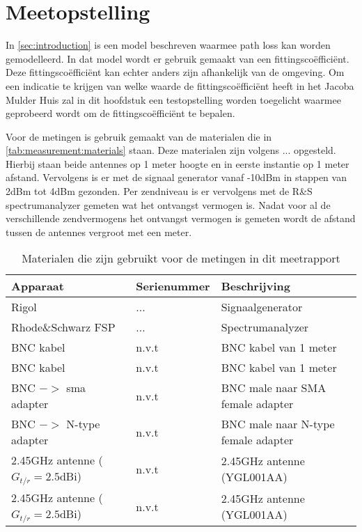 \section{Meetopstelling}
In \autoref{sec:introduction} is een model beschreven waarmee path loss kan worden gemodelleerd. In dat model wordt er gebruik gemaakt van een fittingscoëfficiënt. Deze fittingscoëfficiënt kan echter anders zijn afhankelijk van de omgeving. Om een indicatie te krijgen van welke waarde de fittingscoëfficiënt heeft in het Jacoba Mulder Huis zal in dit hoofdstuk een testopstelling worden toegelicht waarmee geprobeerd wordt om de fittingscoëfficiënt te bepalen.

Voor de metingen is gebruik gemaakt van de materialen die in \autoref{tab:measurement:materials} staan. Deze materialen zijn volgens ... opgesteld. Hierbij staan beide antennes op 1 meter hoogte en in eerste instantie op 1 meter afstand. Vervolgens is er met de signaal generator vanaf -10dBm in stappen van 2dBm tot 4dBm gezonden. Per zendniveau is er vervolgens met de R\&S spectrumanalyzer gemeten wat het ontvangst vermogen is. Nadat voor al de verschillende zendvermogens het ontvangst vermogen is gemeten wordt de afstand tussen de antennes vergroot met een meter.
\begin{table}[ht]
    \centering
    \begin{tabular}{l|l|l}
        Apparaat                            & Serienummer   & Beschrijving \\\hline
        Rigol                               & ...           & Signaalgenerator \\
        Rhode\&Schwarz FSP                  & ...           & Spectrumanalyzer \\
        BNC kabel                           & n.v.t         & BNC kabel van 1 meter \\
        BNC kabel                           & n.v.t         & BNC kabel van 1 meter \\
        BNC $->$ sma adapter                & n.v.t         & BNC male naar SMA female adapter \\
        BNC $->$ N-type adapter             & n.v.t         & BNC male naar N-type female adapter \\
        2.45GHz antenne ($G_{t/r}=2.5$dBi)  & n.v.t         & 2.45GHz antenne (YGL001AA) \\
        2.45GHz antenne ($G_{t/r}=2.5$dBi)  & n.v.t         & 2.45GHz antenne (YGL001AA) \\\hline
    \end{tabular}
    \caption{Materialen die zijn gebruikt voor de metingen in dit meetrapport}
    \label{tab:measurement:materials}
\end{table}




